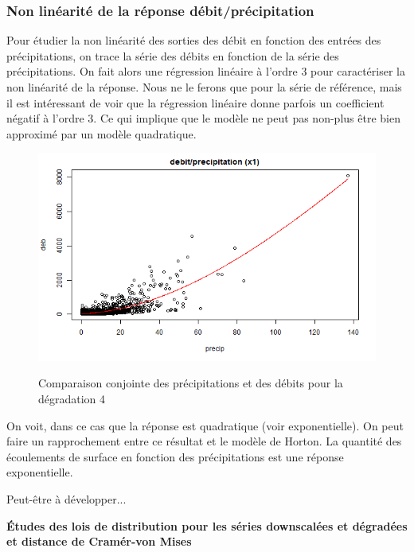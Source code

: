 \documentclass[a4paper,11pt]{article}
\numberwithin{equation}{section}
\begin{document}
\subsubsection{Non linéarité de la réponse débit/précipitation}

Pour étudier la non linéarité des sorties des débit en fonction des entrées des précipitations, on trace la série des débits en fonction de la série des précipitations. On fait alors une régression linéaire à l'ordre 3 pour caractériser la non linéarité de la réponse. Nous ne le ferons que pour la série de référence, mais il est intéressant de voir que la régression linéaire donne parfois un coefficient négatif à l'ordre 3. Ce qui implique que le modèle ne peut pas non-plus être bien approximé par un modèle quadratique.
  
\begin{figure}[H]
	\begin{center}
		\includegraphics[scale=0.45]{images/deb_rapport_pr_deg1.png}\\
	\end{center}
	\caption{Comparaison conjointe des précipitations et des débits pour la dégradation 4}
\end{figure} 

On voit, dans ce cas que la réponse est quadratique (voir exponentielle). On peut faire un rapprochement entre ce résultat et le modèle de Horton. La quantité des écoulements de surface en fonction des précipitations est une réponse exponentielle. 

Peut-être à développer...

\vspace{0.7cm}

\noindent\textbf{Études des lois de distribution pour les séries downscalées et dégradées et distance de Cramér-von Mises}
\end{document}
